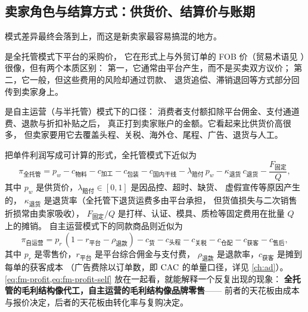 \subsection{卖家角色与结算方式：供货价、结算价与账期}

模式差异最终会落到上，而这是新卖家最容易搞混的地方。

 是全托管模式下平台的采购价，
它在形式上与外贸订单的 FOB 价（贸易术语见 \cite{incoterms2020}）很像，但有两个本质区别：
第一，它通常由平台产生，而不是买卖双方议价；
第二，它一般，但这些费用的风险却通过罚款、
退货追偿、滞销退回等方式部分回传到卖家身上。

 是自主运营（与半托管）模式下的口径：
消费者支付额扣除平台佣金、支付通道费、退款与折扣补贴之后，
真正打到卖家账户的金额。它看起来比供货价高很多，
但卖家要用它去覆盖头程、关税、海外仓、尾程、广告、退货与人工。

把单件利润写成可计算的形式，全托管模式下近似为
\begin{equation}
\pi_{\text{全托管}}
= p_{w} - c_{\text{物料}} - c_{\text{加工}} - c_{\text{包装}}
- c_{\text{国内干线}} - \lambda_{\text{赔付}}\, p_{w}
- \kappa_{\text{退货}}\, c_{\text{退货}} - \frac{F_{\text{固定}}}{Q} ,
\label{eq:fm-profit}
\end{equation}
其中 $p_{w}$ 是供货价，$\lambda_{\text{赔付}} \in [0,1]$ 是因品控、超时、缺货、
虚假宣传等原因产生的，
$\kappa_{\text{退货}}$ 是退货率（全托管下退货运费多由平台承担，
但货值损失与二次销售折损常由卖家吸收），
$F_{\text{固定}}/Q$ 是打样、认证、模具、质检等固定费用在批量 $Q$ 上的摊销。
自主运营模式下的同款商品则近似为
\begin{equation}
\pi_{\text{自运营}}
= p_{r}\,(1 - r_{\text{平台}} - \rho_{\text{退款}})
- c_{\text{货}} - c_{\text{头程}} - c_{\text{关税}} - c_{\text{仓配}}
- c_{\text{获客}} - c_{\text{售后}} ,
\label{eq:fm-profit-self}
\end{equation}
其中 $p_{r}$ 是零售价，$r_{\text{平台}}$ 是平台综合佣金与支付费，
$\rho_{\text{退款}}$ 是退款率，$c_{\text{获客}}$ 是摊到每单的获客成本
（广告费除以订单数，即 $\operatorname{CAC}$ 的单量口径，详见 \cref{ch:ad}）。
\cref{eq:fm-profit,eq:fm-profit-self} 放在一起看，就能解释一个反复出现的现象：
\textbf{全托管的毛利结构像代工，自主运营的毛利结构像品牌零售}——
前者的天花板由成本与报价决定，后者的天花板由转化率与复购决定。

